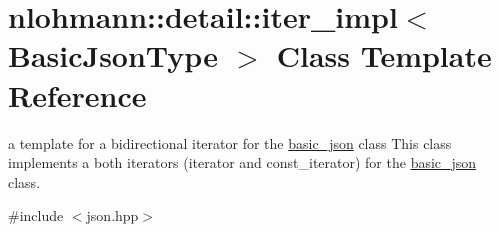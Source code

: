 \hypertarget{classnlohmann_1_1detail_1_1iter__impl}{}\section{nlohmann\+:\+:detail\+:\+:iter\+\_\+impl$<$ Basic\+Json\+Type $>$ Class Template Reference}
\label{classnlohmann_1_1detail_1_1iter__impl}


a template for a bidirectional iterator for the \mbox{\hyperlink{classnlohmann_1_1basic__json}{basic\+\_\+json}} class This class implements a both iterators (iterator and const\+\_\+iterator) for the \mbox{\hyperlink{classnlohmann_1_1basic__json}{basic\+\_\+json}} class.  




{\ttfamily \#include $<$json.\+hpp$>$}


